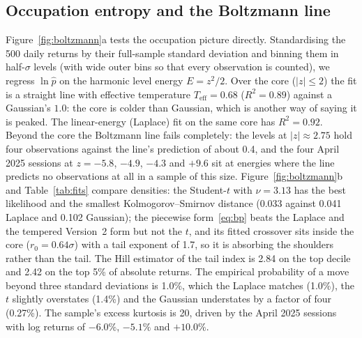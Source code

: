 \documentclass[11pt]{article}
\begin{document}
\subsection{Occupation entropy and the Boltzmann line}
Figure~\ref{fig:boltzmann}a tests the occupation picture directly. Standardising the 500 daily returns by their full-sample standard deviation and binning them in half-$\sigma$ levels (with wide outer bins so that every observation is counted), we regress $\ln\hat p$ on the harmonic level energy $E=z^2/2$. Over the core ($|z|\le2$) the fit is a straight line with effective temperature $T_{\mathrm{eff}}=0.68$ ($R^2=0.89$) against a Gaussian's $1.0$: the core is colder than Gaussian, which is another way of saying it is peaked. The linear-energy (Laplace) fit on the same core has $R^2=0.92$. Beyond the core the Boltzmann line fails completely: the levels at $|z|\approx2.75$ hold four observations against the line's prediction of about 0.4, and the four April 2025 sessions at $z=-5.8$, $-4.9$, $-4.3$ and $+9.6$ sit at energies where the line predicts no observations at all in a sample of this size. Figure~\ref{fig:boltzmann}b and Table~\ref{tab:fits} compare densities: the Student-$t$ with $\nu=3.13$ has the best likelihood and the smallest Kolmogorov--Smirnov distance (0.033 against 0.041 Laplace and 0.102 Gaussian); the piecewise form~\eqref{eq:bp} beats the Laplace and the tempered Version~2 form but not the $t$, and its fitted crossover sits inside the core ($r_0=0.64\sigma$) with a tail exponent of 1.7, so it is absorbing the shoulders rather than the tail. The Hill estimator of the tail index is 2.84 on the top decile and 2.42 on the top 5\% of absolute returns. The empirical probability of a move beyond three standard deviations is 1.0\%, which the Laplace matches (1.0\%), the $t$ slightly overstates (1.4\%) and the Gaussian understates by a factor of four (0.27\%). The sample's excess kurtosis is 20, driven by the April 2025 sessions with log returns of $-6.0\%$, $-5.1\%$ and $+10.0\%$.

\begin{table}[!htbp]
\centering\small
\caption{Density fits to 500 daily SPY log returns, 24 October 2024 to 22 October 2026.}
\label{tab:fits}
\end{table}
\end{document}
